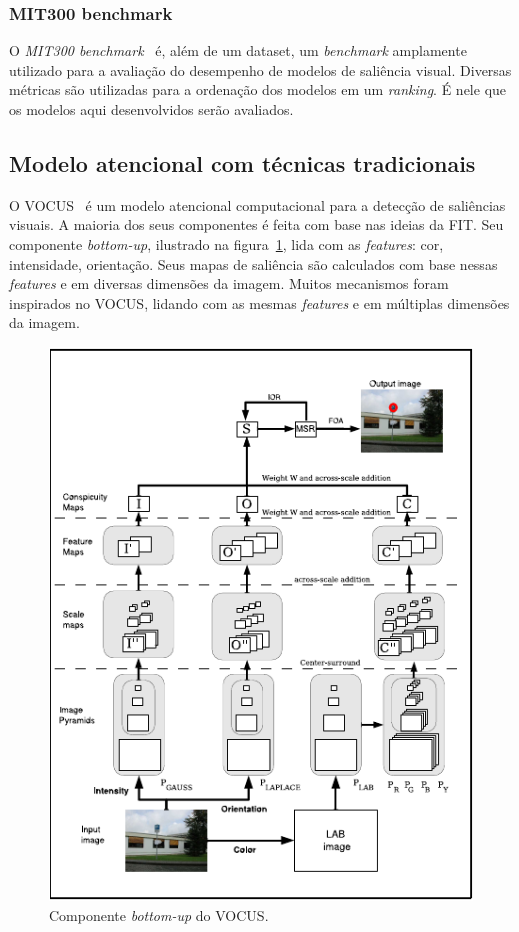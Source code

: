 \documentclass[11pt]{article}
\newcommand{\tit}[1]{\textit{#1}}
\begin{document}
\subsubsection{MIT300 benchmark}
O \tit{MIT300 benchmark}~\cite{mit-300} é, além de um dataset,
um \tit{benchmark} amplamente
utilizado para a avaliação do desempenho de modelos de saliência visual.
Diversas métricas são utilizadas para a ordenação dos modelos em um
\tit{ranking}.
É nele que os modelos aqui desenvolvidos serão avaliados.

\subsection{Modelo atencional com técnicas tradicionais}
O VOCUS~\cite{Frintrop2006} é um modelo atencional computacional
para a detecção de saliências visuais.
A maioria dos seus componentes é feita com base nas ideias da FIT\@.
Seu componente \tit{bottom-up}, ilustrado na figura~\ref{fig:vocus},
lida com as \tit{features}: cor, intensidade, orientação.
Seus mapas de saliência são calculados com base nessas \tit{features}
e em diversas dimensões da imagem.
Muitos mecanismos foram inspirados no VOCUS, lidando com as mesmas
\tit{features} e em múltiplas dimensões da imagem.

\begin{figure}[H]
\begin{center}
    \includegraphics[width=0.6\linewidth]{img/vocus.png}
\end{center}
\caption{Componente \tit{bottom-up} do VOCUS.}
\label{fig:vocus}
\end{figure}
\end{document}
